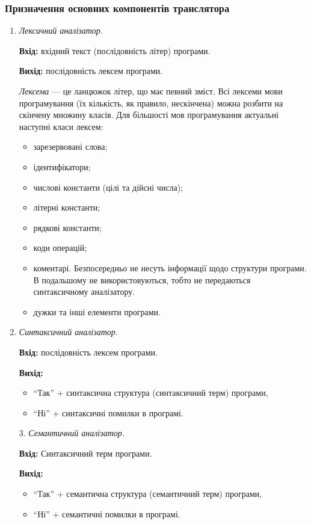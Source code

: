 \subsubsection{Призначення основних компонентів транслятора}

\begin{enumerate}
	\item \textit{Лексичний аналізатор.} \medskip
	
	\textbf{Вхід:} вхідний текст (послідовність літер) програми. \medskip

	\textbf{Вихід:} послідовність лексем програми. \medskip

	\textit{Лексема} --- це ланцюжок літер, що має певний зміст. Всі лексеми мови
	програмування (їх кількість, як правило, нескінчена) можна розбити на скінчену
	множину класів. Для більшості мов програмування актуальні наступні класи
	лексем:
	\begin{itemize}
		\item зарезервовані слова;
		\item ідентифікатори;
		\item числові константи (цілі та дійсні числа);
		\item літерні константи;
		\item рядкові константи;
		\item коди операцій;
		\item коментарі. Безпосередньо не несуть інформації щодо структури
		програми. В подальшому не використовуються, тобто не передаються
		синтаксичному аналізатору.
		\item дужки та інші елементи програми.
	\end{itemize}

	\item \textit{Синтаксичний аналізатор.} \medskip

	\textbf{Вхід:} послідовність лексем програми. \medskip
	
	\textbf{Вихід:}
	\begin{itemize}
		\item ``Так'' + синтаксична структура (синтаксичний терм) програми,
		\item ``Ні'' + синтаксичні помилки в програмі.
	\end{itemize}

3. \textit{Семантичний аналізатор.} \medskip

	\textbf{Вхід:} Синтаксичний терм програми. \medskip

	\textbf{Вихід:} \medskip
	\begin{itemize}
		\item ``Так'' + семантична структура (семантичний терм) програми,
		\item ``Ні'' + семантичні помилки в програмі.
	\end{itemize}


\end{enumerate}
